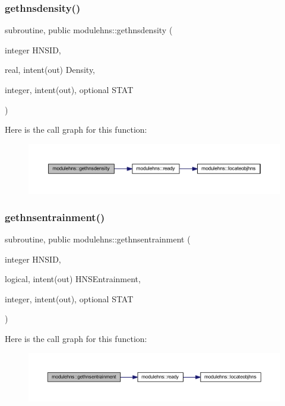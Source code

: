 \subsubsection{\texorpdfstring{gethnsdensity()}{gethnsdensity()}}
{\footnotesize\ttfamily subroutine, public modulehns\+::gethnsdensity (\begin{DoxyParamCaption}\item[{integer}]{H\+N\+S\+ID,  }\item[{real, intent(out)}]{Density,  }\item[{integer, intent(out), optional}]{S\+T\+AT }\end{DoxyParamCaption})}

Here is the call graph for this function\+:\nopagebreak
\begin{figure}[H]
\begin{center}
\leavevmode
\includegraphics[width=350pt]{namespacemodulehns_a4c50440c13ebd880d5f1b94bc868d428_cgraph}
\end{center}
\end{figure}
\mbox{\label{namespacemodulehns_a80a5a74cdd341402c42729e1ce18e7a5}} 
\subsubsection{\texorpdfstring{gethnsentrainment()}{gethnsentrainment()}}
{\footnotesize\ttfamily subroutine, public modulehns\+::gethnsentrainment (\begin{DoxyParamCaption}\item[{integer}]{H\+N\+S\+ID,  }\item[{logical, intent(out)}]{H\+N\+S\+Entrainment,  }\item[{integer, intent(out), optional}]{S\+T\+AT }\end{DoxyParamCaption})}

Here is the call graph for this function\+:\nopagebreak
\begin{figure}[H]
\begin{center}
\leavevmode
\includegraphics[width=350pt]{namespacemodulehns_a80a5a74cdd341402c42729e1ce18e7a5_cgraph}
\end{center}
\end{figure}
\mbox{\label{namespacemodulehns_a256a2f0f1c2c0f036a40633b9605bf3d}} 
